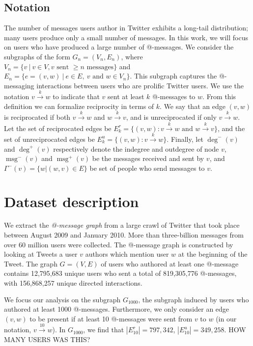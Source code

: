 \documentclass[conference]{IEEEtran}
\begin{document}
\subsection{Notation}
The number of messages users author in Twitter exhibits a long-tail distribution; many users produce only a small number of messages.
In this work, we will focus on users who have produced a large number of @-messages.
We consider the subgraphs of the form $G_n = (V_n, E_n)$, where $V_n = \{v~|~v \in V, v \text{ sent } \ge n \text{ messages}\}$ and $E_n = \{e=(v,w)~|~e \in E,~v \text{ and } w \in V_n\}$.
This subgraph captures the @-messaging interactions between users who are prolific Twitter users.
We use the notation $v \xrightarrow{k} w$ to indicate that $v$ sent at least $k$ @-messages to $w$. 
From this definition we can formalize reciprocity in terms of $k$. 
We say that an edge $(v,w)$ is reciprocated if both $v \xrightarrow{k} w$ and $w \xrightarrow{k} v$, and is unreciprocated if only $v \xrightarrow{k} w$.
Let the set of reciprocated edges be \(E_k^r = \{ (v,w) : v \xrightarrow{k} w \text{ and } w \xrightarrow{k} v \} \), and the set of unreciprocated edges be \(E_k^u = \{ (v,w) : v \xrightarrow{k} w\}\).
Finally, let $\deg^-(v)$ and $\deg^+(v)$ respectively denote the indegree and outdegree of node $v$, $\operatorname{msg}^-(v)$ and $\operatorname{msg}^+(v)$ be the messages received and sent by $v$, and $\Gamma^-(v) = \{w| (w,v) \in E\}$ be set of people who send messages to $v$.

\section{Dataset description}
We extract the \emph{@-message graph} from a large crawl of Twitter that took place between August 2009 and January 2010.
More than three-billion messages from over 60 million users were collected.  
The @-message graph is constructed by looking at Tweets a user $v$ authors which mention user $w$ at the beginning of the Tweet.  
The graph $G = (V,E)$ of users who authored at least one @-message contains 12,795,683 unique users who sent a total of 819,305,776 @-messages, with 156,868,257 unique directed interactions. 

We focus our analysis on the subgraph $G_{1000}$, the subgraph induced by users who authored at least 1000 @-messages. 
Furthermore, we only consider an edge $(v,w)$ to be present if at least 10 @-messages were sent from $v$ to $w$ (in our notation, $v \xrightarrow{10} w$).
In $G_{1000}$, we find that $|E^r_{10}| = 797,342$, $|E^u_{10}| = 349,258$.
HOW MANY USERS WAS THIS?
\end{document}
